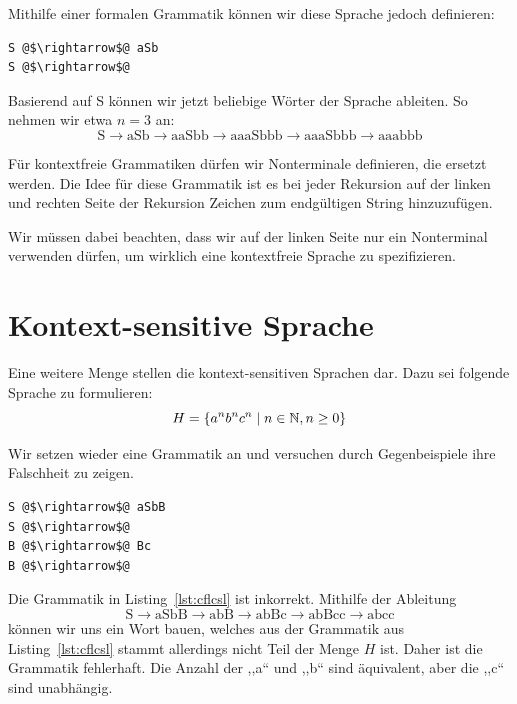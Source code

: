 Mithilfe einer formalen Grammatik können wir diese Sprache jedoch definieren:
\begin{lstlisting}
S @$\rightarrow$@ aSb
S @$\rightarrow$@
\end{lstlisting}

Basierend auf S können wir jetzt beliebige Wörter der Sprache ableiten. So nehmen wir etwa $n=3$ an:
\[
  \text{S} \rightarrow \text{aSb} \rightarrow \text{aaSbb} \rightarrow
  \text{aaaSbbb} \rightarrow \text{aaaSbbb} \rightarrow \text{aaabbb}
\]

Für kontextfreie Grammatiken dürfen wir Nonterminale definieren, die ersetzt werden. Die Idee für diese Grammatik ist es bei jeder Rekursion auf der linken und rechten Seite der Rekursion Zeichen zum endgültigen String hinzuzufügen.

Wir müssen dabei beachten, dass wir auf der linken Seite nur ein Nonterminal verwenden dürfen, um wirklich eine kontextfreie Sprache zu spezifizieren.

\section{Kontext-sensitive Sprache}
%
Eine weitere Menge stellen die kontext-sensitiven Sprachen dar. Dazu sei folgende Sprache zu formulieren:
\[
  H = \left\{a^n b^n c^n \mid n \in \mathbb{N}, n \geq 0\right\}
\]

Wir setzen wieder eine Grammatik an und versuchen durch Gegenbeispiele ihre Falschheit zu zeigen.
\begin{lstlisting}
S @$\rightarrow$@ aSbB
S @$\rightarrow$@
B @$\rightarrow$@ Bc
B @$\rightarrow$@
\end{lstlisting}

Die Grammatik in Listing~\ref{lst:cflcsl} ist inkorrekt. Mithilfe der Ableitung
\[
  \text{S} \rightarrow \text{aSbB} \rightarrow \text{abB} \rightarrow 
  \text{abBc} \rightarrow \text{abBcc} \rightarrow \text{abcc}
\]
können wir uns ein Wort bauen, welches aus der Grammatik aus Listing~\ref{lst:cflcsl} stammt allerdings nicht Teil der Menge $H$ ist. Daher ist die Grammatik fehlerhaft. Die Anzahl der ,,a`` und ,,b`` sind äquivalent, aber die ,,c`` sind unabhängig.

